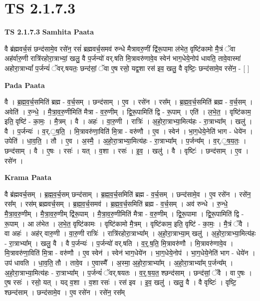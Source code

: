 \documentclass[17pt]{extarticle}
\begin{document}
\section*{ TS 2.1.7.3 }

\textbf{TS 2.1.7.3 } \newline
\textbf{Samhita Paata} \newline

वै ब्र॑ह्मवर्च॒सं छन्द॑सामे॒व रसे॑न॒ रसं॑ ब्रह्मवर्च॒समव॑ रुन्धे मैत्रावरु॒णीं द्वि॑रू॒पामा ल॑भेत॒ वृष्टि॑कामो मै॒त्रं ॅवा अह॑र्वारु॒णी रात्रि॑रहोरा॒त्राभ्यां॒ खलु॒ वै प॒र्जन्यो॑ वर्.षति मि॒त्रावरु॑णावे॒व स्वेन॑ भाग॒धेये॒नोप॑ धावति॒ तावे॒वास्मा॑ अहोरा॒त्राभ्यां᳚ प॒र्जन्यं॑ ॅवर्.षयतः॒ छन्द॑सां॒ ॅवा ए॒ष रसो॒ यद्व॒शा रस॑ इव॒ खलु॒ वै वृष्टिः॒ छन्द॑सामे॒व रसे॑न॒ - [  ] \newline

\textbf{Pada Paata} \newline

वै । ब्र॒ह्म॒व॒र्च॒समिति॑ ब्रह्म - व॒र्च॒सम् । छन्द॑साम् । ए॒व । रसे॑न । रस᳚म् । ब्र॒ह्म॒व॒र्च॒समिति॑ ब्रह्म - व॒र्च॒सम् । अवेति॑ । रु॒न्धे॒ । मै॒त्रा॒व॒रु॒णीमिति॑ मैत्रा - व॒रु॒णीम् । द्वि॒रू॒पामिति॑ द्वि - रू॒पाम् । एति॑ । ल॒भे॒त॒ । वृष्टि॑काम॒ इति॒ वृष्टि॑ - का॒मः॒ । मै॒त्रम् । वै । अहः॑ । वा॒रु॒णी । रात्रिः॑ । अ॒हो॒रा॒त्राभ्या॒मित्य॑हः - रा॒त्राभ्या᳚म् । खलु॑ । वै । प॒र्जन्यः॑ । व॒र्.॒ष॒ति॒ । मि॒त्रावरु॑णा॒विति॑ मि॒त्रा - वरु॑णौ । ए॒व । स्वेन॑ । भा॒ग॒धेये॒नेति॑ भाग - धेये॑न । उपेति॑ । धा॒व॒ति॒ । तौ । ए॒व । अ॒स्मै॒ । अ॒हो॒रा॒त्राभ्या॒मित्य॑हः - रा॒त्राभ्या᳚म् । प॒र्जन्य᳚म् । व॒र्.॒ष॒य॒तः॒ । छन्द॑साम् । वै । ए॒षः । रसः॑ । यत् । व॒शा । रसः॑ । इ॒व॒ । खलु॑ । वै । वृष्टिः॑ । छन्द॑साम् । ए॒व । रसे॑न ।  \newline


\textbf{Krama Paata} \newline

वै ब्र॑ह्मवर्च॒सम् । ब्र॒ह्म॒व॒र्च॒सम् छन्द॑साम् । ब्र॒ह्म॒व॒र्च॒समिति॑ ब्रह्म - व॒र्च॒सम् । छन्द॑सामे॒व । ए॒व रसे॑न । रसे॑न॒ रस᳚म् । रस॑म् ब्रह्मवर्च॒सम् । ब्र॒ह्म॒व॒र्च॒समव॑ । ब्र॒ह्म॒व॒र्च॒समिति॑ ब्रह्म - व॒र्च॒सम् । अव॑ रुन्धे । रु॒न्धे॒ मै॒त्रा॒व॒रु॒णीम् । मै॒त्रा॒व॒रु॒णीम् द्वि॑रू॒पाम् । मै॒त्रा॒व॒रु॒णीमिति॑ मैत्रा - व॒रु॒णीम् । द्वि॒रू॒पामा । द्वि॒रू॒पामिति॑ द्वि - रू॒पाम् । आ ल॑भेत । ल॒भे॒त॒ वृष्टि॑कामः । वृष्टि॑कामो मै॒त्रम् । वृष्टि॑काम॒ इति॒ वृष्टि॑ - का॒मः॒ । मै॒त्रं ॅवै । वा अहः॑ । अह॑र् वारु॒णी । वा॒रु॒णी रात्रिः॑ । रात्रि॑रहोरा॒त्राभ्या᳚म् । अ॒हो॒रा॒त्राभ्या॒म् खलु॑ । अ॒हो॒रा॒त्राभ्या॒मित्य॑हः - रा॒त्राभ्या᳚म् । खलु॒ वै । वै प॒र्जन्यः॑ । प॒र्जन्यो॑ वर्.षति । व॒र्॒.ष॒ति॒ मि॒त्रावरु॑णौ । मि॒त्रावरु॑णावे॒व । मि॒त्रावरु॑णा॒विति॑ मि॒त्रा - वरु॑णौ । ए॒व स्वेन॑ । स्वेन॑ भाग॒धेये॑न । भा॒ग॒धेये॒नोप॑ । भा॒ग॒धेये॒नेति॑ भाग - धेये॑न । उप॑ धावति । धा॒व॒ति॒ तौ । तावे॒व । ए॒वास्मै᳚ । अ॒स्मा॒ अ॒हो॒रा॒त्राभ्या᳚म् । अ॒हो॒रा॒त्राभ्या᳚म् प॒र्जन्य᳚म् । अ॒हो॒रा॒त्राभ्या॒मित्य॑हः - रा॒त्राभ्या᳚म् । प॒र्जन्यं॑ ॅवर्.षयतः । व॒र्॒.ष॒य॒त॒ श्छन्द॑साम् । छन्द॑सां॒ ॅवै । वा ए॒षः । ए॒ष रसः॑ । रसो॒ यत् । यद् व॒शा । व॒शा रसः॑ । रस॑ इव । इ॒व॒ खलु॑ । खलु॒ वै । वै वृष्टिः॑ । वृष्टि॒ श्छन्द॑साम् । छन्द॑सामे॒व । ए॒व रसे॑न । रसे॑न॒ रस᳚म् \newline
\end{document}
